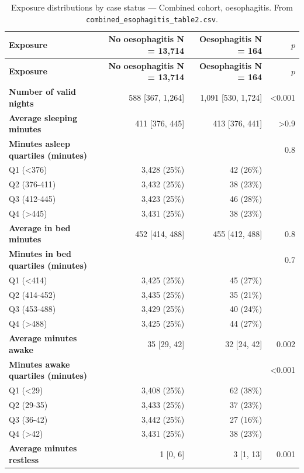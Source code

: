 \documentclass[11pt]{article}
\newcommand{\code}[1]{\texttt{\small #1}}
\begin{document}
\footnotesize\begin{longtable}{@{}p{6.4cm}rrr@{}}
\caption{Exposure distributions by case status --- Combined cohort, oesophagitis. From \code{combined\_esophagitis\_table2.csv}.}\label{tab:appM-t2-combined-esophagitis}\\
\toprule \textbf{Exposure} & \textbf{No oesophagitis     N = 13,714} & \textbf{Oesophagitis     N = 164} & \textbf{$p$} \\ \midrule \endfirsthead
\toprule \textbf{Exposure} & \textbf{No oesophagitis     N = 13,714} & \textbf{Oesophagitis     N = 164} & \textbf{$p$} \\ \midrule \endhead
\textbf{Number of valid nights} & 588 [367, 1,264] & 1,091 [530, 1,724] & <0.001 \\
\textbf{Average sleeping minutes} & 411 [376, 445] & 413 [376, 441] & >0.9 \\
\textbf{Minutes asleep quartiles (minutes)} &  &  & 0.8 \\
\quad Q1 (<376) & 3,428 (25\%) & 42 (26\%) &  \\
\quad Q2 (376-411) & 3,432 (25\%) & 38 (23\%) &  \\
\quad Q3 (412-445) & 3,423 (25\%) & 46 (28\%) &  \\
\quad Q4 (>445) & 3,431 (25\%) & 38 (23\%) &  \\
\textbf{Average in bed minutes} & 452 [414, 488] & 455 [412, 488] & 0.8 \\
\textbf{Minutes in bed quartiles (minutes)} &  &  & 0.7 \\
\quad Q1 (<414) & 3,425 (25\%) & 45 (27\%) &  \\
\quad Q2 (414-452) & 3,435 (25\%) & 35 (21\%) &  \\
\quad Q3 (453-488) & 3,429 (25\%) & 40 (24\%) &  \\
\quad Q4 (>488) & 3,425 (25\%) & 44 (27\%) &  \\
\textbf{Average minutes awake} & 35 [29, 42] & 32 [24, 42] & 0.002 \\
\textbf{Minutes awake quartiles (minutes)} &  &  & <0.001 \\
\quad Q1 (<29) & 3,408 (25\%) & 62 (38\%) &  \\
\quad Q2 (29-35) & 3,433 (25\%) & 37 (23\%) &  \\
\quad Q3 (36-42) & 3,442 (25\%) & 27 (16\%) &  \\
\quad Q4 (>42) & 3,431 (25\%) & 38 (23\%) &  \\
\textbf{Average minutes restless} & 1 [0, 6] & 3 [1, 13] & 0.001 \\

\end{longtable}
\end{document}

